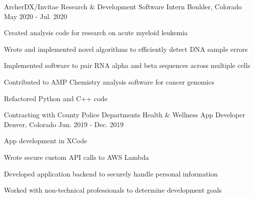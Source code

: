


\begin{cventries}

  \cventry
    {ArcherDX/Invitae}
    {Research \& Development Software Intern}
    {Boulder, Colorado}
    {May 2020 - Jul. 2020}
    {
      \begin{cvitems}
        \item{Created analysis code for research on acute myeloid leukemia}
        \item{Wrote and implemented novel algorithms to efficiently detect DNA sample errors}
        \item{Implemented software to pair RNA alpha and beta sequences across multiple cells}
        \item{Contributed to AMP Chemistry analysis software for cancer genomics}
        \item{Refactored Python and C++ code}
      \end{cvitems}
    }

  \cventry
    {Contracting with County Police Departments} %
    {Health \& Wellness App Developer} %
    {Denver, Colorado} %
    {Jun. 2019 - Dec. 2019} %
    {
      \begin{cvitems} %
        \item {App development in XCode}
        \item {Wrote secure custom API calls to AWS Lambda}
        \item {Developed application backend to securely handle personal information}
        \item {Worked with non-technical professionals to determine development goals}
      \end{cvitems}
    }


\end{cventries}
